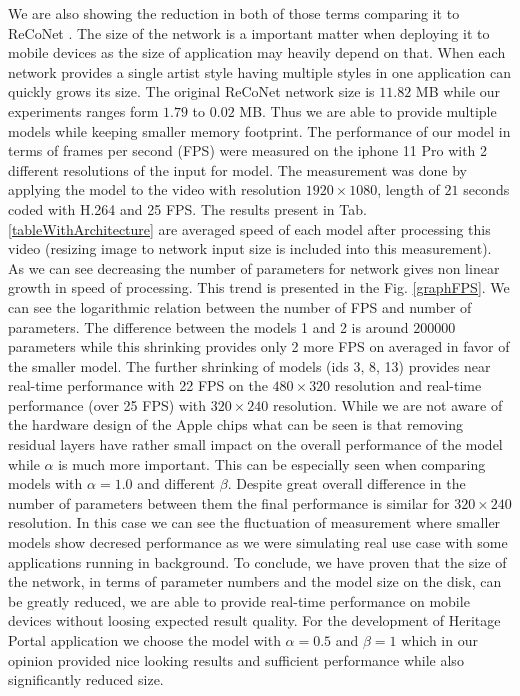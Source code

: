 \documentclass[a4paper,conference]{IEEEtran}
\newcommand{\ResidualLayerNumber}{\beta}
\begin{document}
We are also showing the reduction in both of those terms comparing it to ReCoNet \cite{Reconet}. The size of the network is a important matter when deploying it to mobile devices as the size of application may heavily depend on that. When each network provides a single artist style having multiple styles in one application can quickly grows its size. The original ReCoNet network size is $11.82$ MB while our experiments ranges form $1.79$ to $0.02$ MB. Thus we are able to provide multiple models while keeping smaller memory footprint. The performance of our model in terms of frames per second (FPS) were measured on the iphone 11 Pro with 2 different resolutions of the input for model. The measurement was done by applying the model to the video with resolution $1920\times1080$, length of $21$ seconds coded with H.264 and 25 FPS. The results present in Tab. \ref{tableWithArchitecture} are averaged speed of each model after processing this video (resizing image to network input size is included into this measurement). As we can see decreasing the number of parameters for network gives non linear growth in speed of processing. This trend is presented in the Fig. \ref{graphFPS}. We can see the logarithmic relation between the number of FPS and number of parameters. The difference between the models  1 and  2 is around $200 000$ parameters while this shrinking provides only 2 more FPS on averaged in favor of the smaller model. The further shrinking of models (ids 3, 8, 13) provides near real-time performance with 22 FPS on the $480\times320$ resolution and real-time performance (over 25 FPS) with $320\times240$ resolution. While we are not aware of the hardware design of the Apple chips what can be seen is that removing residual layers have rather small impact on the overall performance of the model while $\alpha$ is much more important. This can be especially seen when comparing models with $\alpha=1.0$ and different $\ResidualLayerNumber$. Despite great overall difference in the number of parameters between them the final performance is similar for $320\times240$ resolution. In this case we can see the fluctuation of measurement where smaller models show decresed performance as we were simulating real use case with some applications running in background. To conclude, we have proven that the size of the network, in terms of parameter numbers and the model size on the disk, can be greatly reduced, we are able to provide real-time performance on mobile devices without loosing expected result quality.  For the development of Heritage Portal application we choose the model with  $\alpha=0.5$ and $\ResidualLayerNumber=1$ which in our opinion provided nice looking results and sufficient performance while also significantly reduced size.
\end{document}
